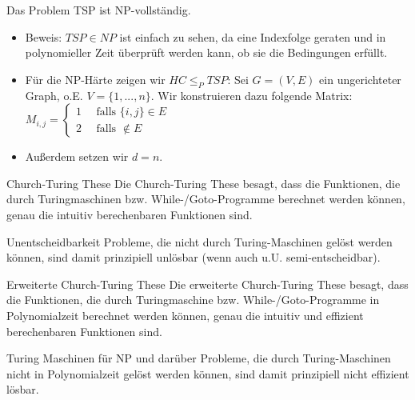 \documentclass[avery5371]{flashcards}
\begin{document}
\begin{flashcard}[Satz]{Das Problem TSP} ist NP-vollständig.
\begin{itemize}
\item Beweis: $TSP\in NP$ ist einfach zu sehen, da eine Indexfolge geraten und in polynomieller Zeit überprüft werden kann, ob sie die Bedingungen erfüllt.
\item Für die NP-Härte zeigen wir $HC\leq_P TSP$: Sei $G=(V,E)$ ein ungerichteter Graph, o.E. $V=\{1,...,n\}$. Wir konstruieren dazu folgende Matrix: $M_{i,j}=\begin{cases} 1\quad\text{ falls } \{i,j\}\in E\\ 2 \quad\text{ falls }\not\in E\end{cases}$
\item Außerdem setzen wir $d=n$.
\end{itemize}
\end{flashcard}

\begin{flashcard}{Church-Turing These} Die Church-Turing These besagt, dass die Funktionen, die durch Turingmaschinen bzw. While-/Goto-Programme berechnet werden können, genau die intuitiv berechenbaren Funktionen sind. 
\end{flashcard}

\begin{flashcard}{Unentscheidbarkeit} Probleme, die nicht durch Turing-Maschinen gelöst werden können, sind damit prinzipiell unlösbar (wenn auch u.U. semi-entscheidbar).
\end{flashcard}

\begin{flashcard}{Erweiterte Church-Turing These} Die erweiterte Church-Turing These besagt, dass die Funktionen, die durch Turingmaschine bzw. While-/Goto-Programme in Polynomialzeit berechnet werden können, genau die intuitiv und effizient berechenbaren Funktionen sind.
\end{flashcard}

\begin{flashcard}{Turing Maschinen für NP und darüber} Probleme, die durch Turing-Maschinen nicht in Polynomialzeit gelöst werden können, sind damit prinzipiell nicht effizient lösbar.
\end{flashcard}
\end{document}
